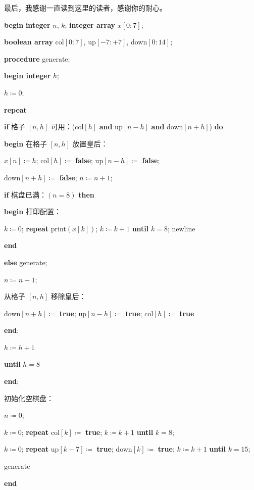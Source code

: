 最后，我感谢一直读到这里的读者，感谢你的耐心。
\bigskip

\noindent
\textbf{begin} \textbf{integer} $n$, $k$; \textbf{integer array} $x[0:7]$;

\noindent
\quad \quad \textbf{boolean array} col$[0:7]$, up$[-7:+7]$, down$[0:14]$;

\noindent
\quad \textbf{procedure} generate;

\noindent
\quad \textbf{begin integer} $h$;

\noindent
\quad \quad $h \coloneq 0$;

\noindent
\quad \quad \textbf{repeat}

\noindent
\quad \quad \quad \textbf{if} 格子 $[n,h]$ 可用：(col$[h]$ \textbf{and} up$[n-h]$ \textbf{and} down$[n+h]$) \textbf{do}

\noindent
\quad \quad \quad \textbf{begin} 在格子 $[n,h]$ 放置皇后：

\noindent
\quad \quad \quad \quad \quad $x[n] \coloneq h$; col$[h]\coloneq$ \textbf{false}; up$[n-h]\coloneq$ \textbf{false};

\noindent
\quad \quad \quad \quad \quad down$[n+h]\coloneq$ \textbf{false}; $n\coloneq n + 1$;

\noindent
\quad \quad \quad \quad \textbf{if} 棋盘已满：$(n = 8)$ \textbf{then}

\noindent
\quad \quad \quad \quad \textbf{begin} 打印配置：

\noindent
\quad \quad \quad \quad \quad $k\coloneq 0$; \textbf{repeat} print$(x[k])$; $k\coloneq k + 1$ \textbf{until} $k = 8$; newline


\noindent
\quad \quad \quad \quad \textbf{end}

\noindent
\quad \quad \quad \textbf{else} generate;

\noindent
\quad \quad \quad \quad $n \coloneq n - 1;$

\noindent
\quad \quad \quad \quad 从格子 $[n,h]$ 移除皇后：

\noindent
\quad \quad \quad \quad \quad down$[n+h]\coloneq$ \textbf{true}; up$[n-h] \coloneq$ \textbf{true}; col$[h]\coloneq$ \textbf{true}

\noindent
\quad \quad \quad \textbf{end};

\noindent
\quad \quad \quad $h\coloneq h + 1$

\noindent
\quad \quad \textbf{until} $h = 8$

\noindent
\quad \textbf{end};

\noindent
\quad 初始化空棋盘：

\noindent
\quad \quad $n \coloneq 0$;

\noindent
\quad \quad $k\coloneq 0$; \textbf{repeat} col$[k] \coloneq$ \textbf{true}; $k\coloneq k + 1$ \textbf{until} $k = 8$;

\noindent
\quad \quad $k\coloneq 0$; \textbf{repeat} up$[k-7] \coloneq$ \textbf{true}; down$[k] \coloneq$ \textbf{\textbf{true}}; $k\coloneq k + 1$ \textbf{until} $k=15$;

\noindent
\quad generate

\noindent
\textbf{end}
